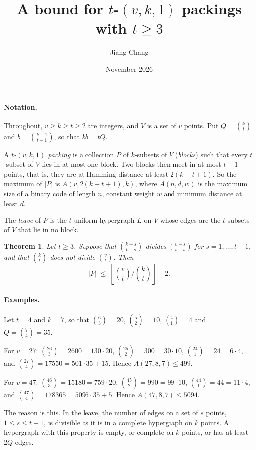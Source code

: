 \documentclass[11pt,a4paper]{article}
\title{\large\bfseries A bound for $t$-$(v,k,1)$ packings with $t\ge 3$}
\author{Jiang Chang}
\date{November 2026}
\newtheorem*{theorem}{Theorem}
\newcommand{\abs}[1]{\lvert #1\rvert}
\begin{document}
\maketitle

\paragraph{Notation.}
Throughout, $v\ge k\ge t\ge 2$ are integers, and $V$ is a set of $v$ points.
Put $Q=\binom{k}{t}$ and $b=\binom{k-1}{t-1}$, so that $kb=tQ$.

A \emph{$t$-$(v,k,1)$ packing} is a collection $P$ of $k$-subsets of $V$
(\emph{blocks}) such that every $t$-subset of $V$ lies in at most one block.
Two blocks then meet in at most $t-1$ points, that is, they are at Hamming
distance at least $2(k-t+1)$. So the maximum of $\abs{P}$ is
$A(v,2(k-t+1),k)$, where $A(n,d,w)$ is the maximum size of a binary code of
length $n$, constant weight $w$ and minimum distance at least $d$.

The \emph{leave} of $P$ is the $t$-uniform hypergraph $L$ on $V$ whose edges
are the $t$-subsets of $V$ that lie in no block.

\begin{theorem}
Let $t\ge 3$. Suppose that $\binom{k-s}{t-s}$ divides $\binom{v-s}{t-s}$ for
$s=1,\dots,t-1$, and that $\binom{k}{t}$ does not divide $\binom{v}{t}$. Then
\[
\abs{P}\;\le\;\left\lfloor \binom{v}{t}\Big/\binom{k}{t}\right\rfloor-2 .
\]
\end{theorem}

\paragraph{Examples.}
Let $t=4$ and $k=7$, so that $\binom63=20$, $\binom52=10$, $\binom41=4$ and
$Q=\binom74=35$.

For $v=27$: $\binom{26}{3}=2600=130\cdot 20$, $\binom{25}{2}=300=30\cdot 10$,
$\binom{24}{1}=24=6\cdot 4$, and $\binom{27}{4}=17550=501\cdot 35+15$.
Hence $A(27,8,7)\le 499$.

For $v=47$: $\binom{46}{3}=15180=759\cdot 20$, $\binom{45}{2}=990=99\cdot 10$,
$\binom{44}{1}=44=11\cdot 4$, and $\binom{47}{4}=178365=5096\cdot 35+5$.
Hence $A(47,8,7)\le 5094$.

\medskip
The reason is this. In the leave, the number of edges on a set of $s$
points, $1\le s\le t-1$, is divisible as it is in a complete hypergraph on
$k$ points. A hypergraph with this property is empty, or complete on $k$
points, or has at least $2Q$ edges.
\end{document}
